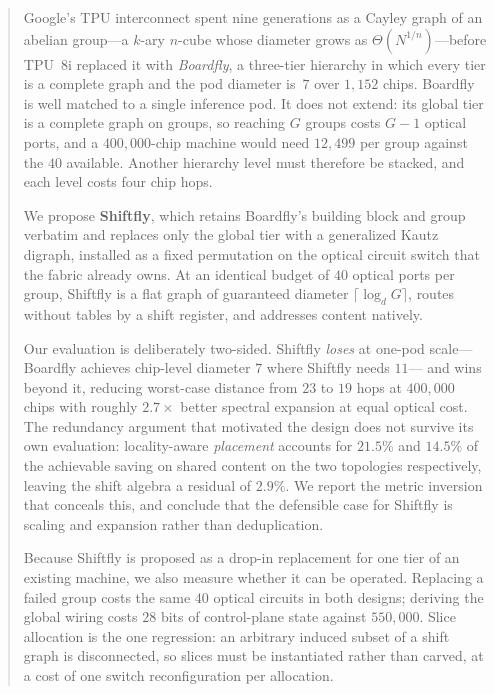 \documentclass[sigconf,nonacm]{acmart}
\theoremstyle{acmdefinition}%
\begin{document}
\begin{abstract}
Google's TPU interconnect spent nine generations as a Cayley graph of an abelian
group---a $k$-ary $n$-cube whose diameter grows as $\Theta(N^{1/n})$---before
TPU~8i replaced it with \emph{Boardfly}, a three-tier hierarchy in which every
tier is a complete graph and the pod diameter is~$7$ over $1{,}152$ chips.
Boardfly is well matched to a single inference pod. It does not extend: its
global tier is a complete graph on groups, so reaching $G$ groups costs $G-1$
optical ports, and a $400{,}000$-chip machine would need $12{,}499$ per group
against the $40$ available. Another hierarchy level must therefore be stacked,
and each level costs four chip hops.

We propose \textbf{Shiftfly}, which retains Boardfly's building block and group
verbatim and replaces only the global tier with a generalized Kautz digraph,
installed as a fixed permutation on the optical circuit switch that the fabric
already owns. At an identical budget of $40$ optical ports per group, Shiftfly
is a flat graph of guaranteed diameter $\lceil\log_d G\rceil$, routes without
tables by a shift register, and addresses content natively.

Our evaluation is deliberately two-sided. Shiftfly \emph{loses} at one-pod
scale---Boardfly achieves chip-level diameter $7$ where Shiftfly needs $11$---
and wins beyond it, reducing worst-case distance from $23$ to $19$ hops at
$400{,}000$ chips with roughly $2.7\times$ better spectral expansion at equal
optical cost. The redundancy argument that motivated the design does not
survive its own evaluation: locality-aware \emph{placement} accounts for
$21.5\%$ and $14.5\%$ of the achievable saving on shared content on the two
topologies respectively, leaving the shift algebra a residual of $2.9\%$. We
report the metric inversion that conceals this, and conclude that the defensible
case for Shiftfly is scaling and expansion rather than deduplication.

Because Shiftfly is proposed as a drop-in replacement for one tier of an
existing machine, we also measure whether it can be operated. Replacing a failed
group costs the same $40$ optical circuits in both designs; deriving the global
wiring costs $28$ bits of control-plane state against $550{,}000$. Slice
allocation is the one regression: an arbitrary induced subset of a shift graph
is disconnected, so slices must be instantiated rather than carved, at a cost of
one switch reconfiguration per allocation.
\end{abstract}
\end{document}
